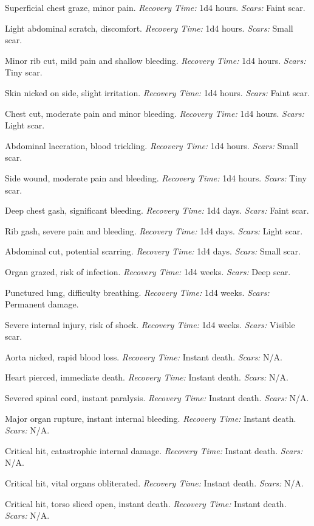 \documentclass[12pt]{book}  %
\begin{document}
\begin{description}[labelwidth=1.5em, leftmargin=*, itemsep=0.4em]
    \item[01 -] Superficial chest graze, minor pain. \textit{Recovery Time:} 1d4 hours. \textit{Scars:} Faint scar.
    \item[02 -] Light abdominal scratch, discomfort. \textit{Recovery Time:} 1d4 hours. \textit{Scars:} Small scar.
    \item[03 -] Minor rib cut, mild pain and shallow bleeding. \textit{Recovery Time:} 1d4 hours. \textit{Scars:} Tiny scar.
    \item[04 -] Skin nicked on side, slight irritation. \textit{Recovery Time:} 1d4 hours. \textit{Scars:} Faint scar.
    \item[05 -] Chest cut, moderate pain and minor bleeding. \textit{Recovery Time:} 1d4 hours. \textit{Scars:} Light scar.
    \item[06 -] Abdominal laceration, blood trickling. \textit{Recovery Time:} 1d4 hours. \textit{Scars:} Small scar.
    \item[07 -] Side wound, moderate pain and bleeding. \textit{Recovery Time:} 1d4 hours. \textit{Scars:} Tiny scar.
    \item[08 -] Deep chest gash, significant bleeding. \textit{Recovery Time:} 1d4 days. \textit{Scars:} Faint scar.
    \item[09 -] Rib gash, severe pain and bleeding. \textit{Recovery Time:} 1d4 days. \textit{Scars:} Light scar.
    \item[10 -] Abdominal cut, potential scarring. \textit{Recovery Time:} 1d4 days. \textit{Scars:} Small scar.
    \item[11 -] Organ grazed, risk of infection. \textit{Recovery Time:} 1d4 weeks. \textit{Scars:} Deep scar.
    \item[12 -] Punctured lung, difficulty breathing. \textit{Recovery Time:} 1d4 weeks. \textit{Scars:} Permanent damage.
    \item[13 -] Severe internal injury, risk of shock. \textit{Recovery Time:} 1d4 weeks. \textit{Scars:} Visible scar.
    \item[14 -] Aorta nicked, rapid blood loss. \textit{Recovery Time:} Instant death. \textit{Scars:} N/A.
    \item[15 -] Heart pierced, immediate death. \textit{Recovery Time:} Instant death. \textit{Scars:} N/A.
    \item[16 -] Severed spinal cord, instant paralysis. \textit{Recovery Time:} Instant death. \textit{Scars:} N/A.
    \item[17 -] Major organ rupture, instant internal bleeding. \textit{Recovery Time:} Instant death. \textit{Scars:} N/A.
    \item[18 -] Critical hit, catastrophic internal damage. \textit{Recovery Time:} Instant death. \textit{Scars:} N/A.
    \item[19 -] Critical hit, vital organs obliterated. \textit{Recovery Time:} Instant death. \textit{Scars:} N/A.
    \item[20 -] Critical hit, torso sliced open, instant death. \textit{Recovery Time:} Instant death. \textit{Scars:} N/A.
\end{description}
\end{document}
